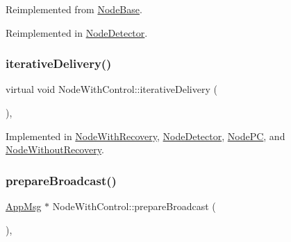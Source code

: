 Reimplemented from \hyperlink{class_node_base_af7910c39553111295b66c88742d1198a}{Node\+Base}.



Reimplemented in \hyperlink{class_node_detector_aefa188ab0657837b1b57f24674d3ef22}{Node\+Detector}.

\mbox{\label{class_node_with_control_a4f78078272b90937e0746c797443b37d}} 
\subsubsection{\texorpdfstring{iterative\+Delivery()}{iterativeDelivery()}}
{\footnotesize\ttfamily virtual void Node\+With\+Control\+::iterative\+Delivery (\begin{DoxyParamCaption}{ }\end{DoxyParamCaption})\hspace{0.3cm}{\ttfamily [protected]}, {}}



Implemented in \hyperlink{class_node_with_recovery_a9b61912f38b62452584dc80bf261ef4e}{Node\+With\+Recovery}, \hyperlink{class_node_detector_a17ecf9939fce7471f4513b66185743cc}{Node\+Detector}, \hyperlink{class_node_p_c_a7ac363db597ebadd3b18dd4343440aa1}{Node\+PC}, and \hyperlink{class_node_without_recovery_a65e21db6d6b4e72b898fd567f8b4aee2}{Node\+Without\+Recovery}.

\mbox{\label{class_node_with_control_ab871014cf3f42d834f8d34ad5498174c}} 
\subsubsection{\texorpdfstring{prepare\+Broadcast()}{prepareBroadcast()}}
{\footnotesize\ttfamily \hyperlink{class_app_msg}{App\+Msg} $\ast$ Node\+With\+Control\+::prepare\+Broadcast (\begin{DoxyParamCaption}{ }\end{DoxyParamCaption})\hspace{0.3cm}{\ttfamily [protected]}, {\ttfamily [virtual]}}



